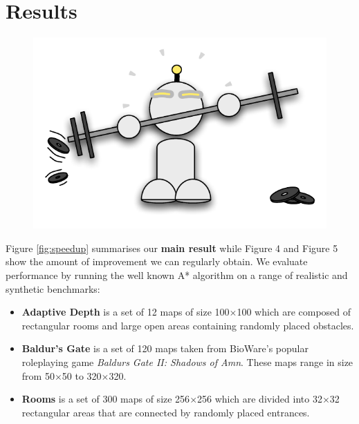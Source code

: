 \section{Results}
 \begin{figure}
		\includegraphics[width=0.5\columnwidth]{diagrams/robot_weights.pdf}
 \end{figure}

Figure \ref{fig:speedup} summarises our \textbf{main result} while Figure
4 and Figure 5 show the amount of improvement we
can regularly obtain. We evaluate performance by running the well known A* algorithm on a range of realistic and synthetic benchmarks:
\begin{itemize}
\item{
\textbf{Adaptive Depth} is a set of 12 maps of size 100$\times$100 which are
composed of rectangular rooms and large open areas containing randomly placed obstacles.
}
\item{
\textbf{Baldur's Gate} is a set of 120 maps taken from BioWare's popular
roleplaying game \emph{Baldurs Gate II: Shadows of Amn}. 
These maps range in size from 50$\times$50 to 320$\times$320.
}
\item{
\textbf{Rooms} is a set of 300 maps of size 256$\times$256 which are divided into 32$\times$32
rectangular areas that are connected by randomly placed entrances.
}
\end{itemize}


